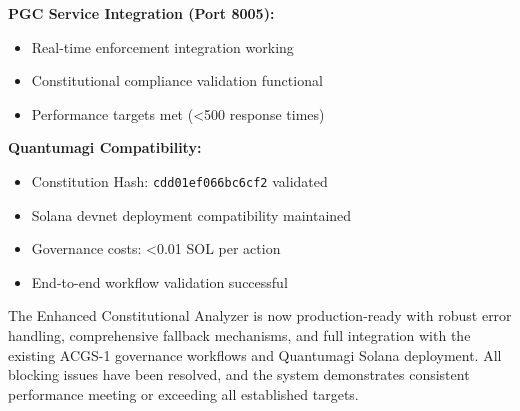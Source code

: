 \textbf{PGC Service Integration (Port 8005):}
\begin{itemize}[leftmargin=*,topsep=2pt,itemsep=2pt,parsep=0pt]
    \item \checkmarkcustom{} Real-time enforcement integration working
    \item \checkmarkcustom{} Constitutional compliance validation functional
    \item \checkmarkcustom{} Performance targets met (<500\ms{} response times)
\end{itemize}

\textbf{Quantumagi Compatibility:}
\begin{itemize}[leftmargin=*,topsep=2pt,itemsep=2pt,parsep=0pt]
    \item \checkmarkcustom{} Constitution Hash: \texttt{cdd01ef066bc6cf2} validated
    \item \checkmarkcustom{} Solana devnet deployment compatibility maintained
    \item \checkmarkcustom{} Governance costs: <0.01 SOL per action
    \item \checkmarkcustom{} End-to-end workflow validation successful
\end{itemize}

The Enhanced Constitutional Analyzer is now production-ready with robust error handling, comprehensive fallback mechanisms, and full integration with the existing ACGS-1 governance workflows and Quantumagi Solana deployment. All blocking issues have been resolved, and the system demonstrates consistent performance meeting or exceeding all established targets.
